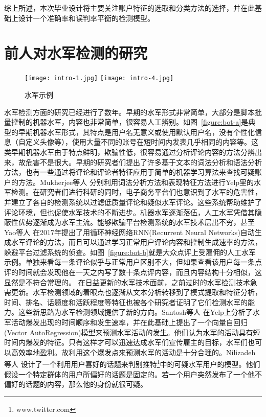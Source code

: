 综上所述，本次毕业设计将主要关注账户特征的选取和分类方法的选择，并在此基础上设计一个准确率和误判率平衡的检测模型。

\section{前人对水军检测的研究}

\begin{figure}[b]
	\centering
	{\texttt{[image: intro-1.jpg]}}
	\hspace{4em}
	{\texttt{[image: intro-4.jpg]}}
	\caption[水军示例]{水军示例}
\end{figure}

水军检测方面的研究已经进行了数年\cite{Spirin:2012}。早期的水军形式非常简单，大部分是脚本批量控制的机器水军，内容也非常简单，很容易人工辨别。如图~\ref{figure:bot-a}是典型的早期机器水军形式，其特点是用户名无意义或使用默认用户名，没有个性化信息（自定义头像等），使用大量不同的账号在短时间内发表几乎相同的内容等。这类早期机器水军由于特点鲜明，欺骗性低，很容易通过分析评论内容的方法分辨出来，故危害不是很大。早期的研究者们提出了许多基于文本的词法分析和语法分析方法，也有一些通过将评论和评论者特征应用于简单的机器学习算法来查找可疑账户的方法。Mukherjee等人 \parencite{Mukherjee:2013}分别利用词法分析方法和表现特征方法进行Yelp里的水军检测。在研究者们进行科研的同时，电子商务平台们也意识到了水军的危害性，并建立了各自的检测系统以过滤低质量评论和疑似水军评论。这些系统帮助维护了评论环境，但也促使水军技术的不断进步。机器水军逐渐落伍，人工水军凭借其隐蔽性优势逐渐成为水军主流。能够欺骗平台检测系统的水军技术层出不穷，甚至Yao等人 \parencite{Y.Yao:2017}在2017年提出了用循环神经网络RNN(Recurrent Neural Networks)自动生成水军评论的方法，而且可以通过学习正常用户评论内容和控制生成速率的方法，躲避平台过滤系统的侦查。如图~\ref{figure:bot-b}就是大众点评上受雇佣的人工水军示例。单独来看每一条评论似乎与正常用户区别不大，但如果查看该用户每一条点评的时间就会发现他在一天之内写了数十条点评内容，而且内容结构十分相似，这显然是不符合常理的。 在日益更新的水军技术面前，之前过时的水军检测技术急需更新。水军检测领域的着眼点也逐渐从文本分析转移到了模式提取和特征分析，时间、排名、话题度和活跃程度等特征也被各个研究者证明了它们检测水军的能力。这些新思路为水军检测领域提供了新的方向。Santosh等人 \parencite{Santosh:2016}在Yelp上分析了水军活动爆发出现的时间顺序和发生速率，并在此基础上提出了一个向量自回归(Vector AutoRegression)模型来预测水军活动的发生。他们认为水军的活动具有短时间内爆发的特征。只有这样才可以迅速达成水军们宣传雇主的目标，水军们也可以高效率地盈利。故利用这个爆发点来预测水军的活动是十分合理的。Nilizadeh等人 \parencite{Nilizadeh:2017} 设计了一个利用用户喜好的话题来判别推特\footnote{www.twitter.com}中的可疑水军用户的模型。他们假设一个特定群体的用户所偏好的话题是固定的。若一个用户突然发布了一个他不偏好的话题的内容，那么他的身份就很可疑。



